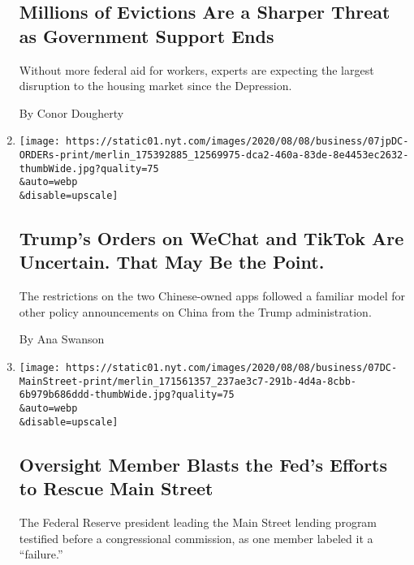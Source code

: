 \begin{enumerate}
{  \subsection{Millions of Evictions Are a Sharper Threat as Government
  Support
  Ends}\label{millions-of-evictions-are-a-sharper-threat-as-government-support-ends}}

  Without more federal aid for workers, experts are expecting the
  largest disruption to the housing market since the Depression.

  By Conor Dougherty
\item
  \href{/2020/08/07/business/economy/trump-executive-order-tiktok-wechat.html}{}

  \texttt{[image: https://static01.nyt.com/images/2020/08/08/business/07jpDC-ORDERs-print/merlin\_175392885\_12569975-dca2-460a-83de-8e4453ec2632-thumbWide.jpg?quality=75\\\&auto=webp\\\&disable=upscale]}

  \hypertarget{trumps-orders-on-wechat-and-tiktok-are-uncertain-that-may-be-the-point}{%
  \subsection{Trump's Orders on WeChat and TikTok Are Uncertain. That
  May Be the
  Point.}\label{trumps-orders-on-wechat-and-tiktok-are-uncertain-that-may-be-the-point}}

  The restrictions on the two Chinese-owned apps followed a familiar
  model for other policy announcements on China from the Trump
  administration.

  By Ana Swanson
\item
  \href{/2020/08/07/business/economy/federal-reserve-main-street-lending.html}{}

  \texttt{[image: https://static01.nyt.com/images/2020/08/08/business/07DC-MainStreet-print/merlin\_171561357\_237ae3c7-291b-4d4a-8cbb-6b979b686ddd-thumbWide.jpg?quality=75\\\&auto=webp\\\&disable=upscale]}

  \hypertarget{oversight-member-blasts-the-feds-efforts-to-rescue-main-street}{%
  \subsection{Oversight Member Blasts the Fed's Efforts to Rescue Main
  Street}\label{oversight-member-blasts-the-feds-efforts-to-rescue-main-street}}

  The Federal Reserve president leading the Main Street lending program
  testified before a congressional commission, as one member labeled it
  a ``failure.''


\end{enumerate}
